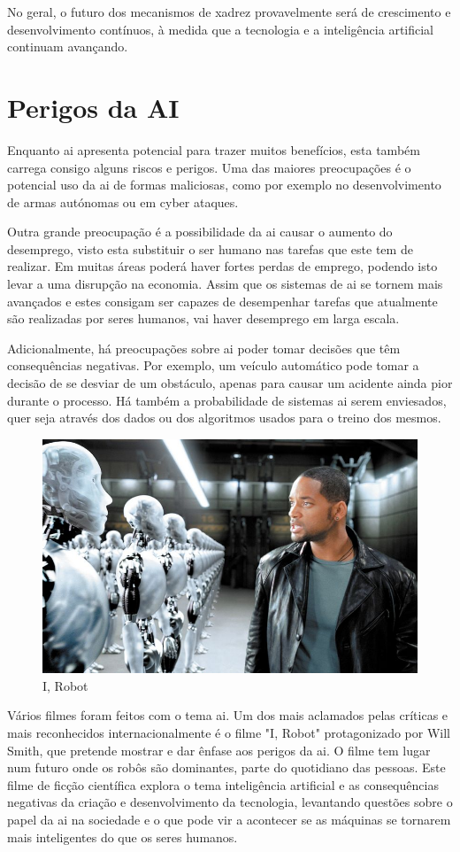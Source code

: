 \documentclass{report}
\begin{document}
No geral, o futuro dos mecanismos de xadrez provavelmente será de crescimento e desenvolvimento contínuos, à medida que a tecnologia e a inteligência artificial continuam avançando.


\chapter{Perigos da AI}
\label{chap.perigos}

Enquanto \ac{ai} apresenta potencial para trazer muitos benefícios, esta também carrega consigo alguns riscos e perigos. Uma das maiores preocupações é o potencial uso da \ac{ai} de formas maliciosas, como por exemplo no desenvolvimento de armas autónomas ou em cyber ataques.

Outra grande preocupação é a possibilidade da \ac{ai} causar o aumento do desemprego, visto esta substituir o ser humano nas tarefas que este tem de realizar. Em muitas áreas poderá haver fortes perdas de emprego, podendo isto levar a uma disrupção na economia. Assim que os sistemas de \ac{ai} se tornem mais avançados e estes consigam ser capazes de desempenhar tarefas que atualmente são realizadas por seres humanos, vai haver desemprego em larga escala. 

Adicionalmente, há preocupações sobre \ac{ai} poder tomar decisões que têm consequências negativas. Por exemplo, um veículo automático pode tomar a decisão de se desviar de um obstáculo, apenas para causar um acidente ainda pior durante o processo. Há também a probabilidade de sistemas \ac{ai} serem enviesados, quer seja através dos dados ou dos algoritmos usados para o treino dos mesmos.
\begin{figure}
\includegraphics[width=0.9\linewidth]{irobot.png} 
\caption{I, Robot}
\label{i,robot}
\end{figure}
Vários filmes foram feitos com o tema \ac{ai}. 
Um dos mais aclamados pelas críticas e mais reconhecidos internacionalmente é o filme "I, Robot" protagonizado por Will Smith, que pretende mostrar e dar ênfase aos perigos da \ac{ai}. O filme tem lugar num futuro onde os robôs são dominantes, parte do quotidiano das pessoas. Este filme de ficção científica explora o tema inteligência artificial e as consequências negativas da criação e desenvolvimento da tecnologia, levantando questões sobre o papel da \ac{ai} na sociedade e o que pode vir a acontecer se as máquinas se tornarem mais inteligentes do que os seres humanos.
\end{document}
